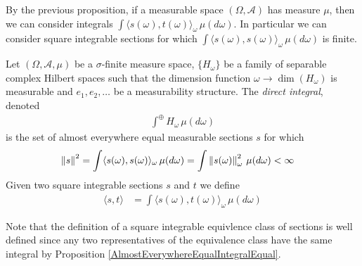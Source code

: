 By the previous proposition, if a measurable space $(\Omega, \mathcal{A})$ has measure $\mu$, then we can consider integrals $\int \langle s(\omega), t(\omega) \rangle_\omega \, \mu(d\omega)$.  In particular we can consider square integrable sections for which $\int \langle s(\omega), s(\omega) \rangle_\omega \, \mu(d\omega)$ is finite.

\begin{defn}Let $(\Omega, \mathcal{A}, \mu)$ be a $\sigma$-finite measure space, $\lbrace H_\omega \rbrace$ be a family of separable complex Hilbert spaces such that the dimension function $\omega \to \dim(H_\omega)$ is measurable and $e_1, e_2,\dotsc$ be a measurability structure. The \emph{direct integral}, denoted
\begin{align*}
\int^\oplus H_\omega \, \mu(d\omega)
\end{align*}
is the set of almost everywhere equal measurable sections $s$ for which
\begin{align*}
\left \lVert s \right \rVert^2 &= \int \langle s(\omega), s(\omega) \rangle_\omega \, \mu(d\omega) = \int \left \lVert  s(\omega) \right \rVert^2_\omega \, \mu(d\omega) < \infty
\end{align*}
Given two square integrable sections $s$ and $t$ we define 
\begin{align*}
\langle s, t \rangle &= \int \langle s(\omega), t(\omega) \rangle_\omega \, \mu(d\omega)
\end{align*}
\end{defn}

Note that the definition of a square integrable equivlence class of sections is well defined since any two representatives of the equivalence class have the same integral by Proposition \ref{AlmostEverywhereEqualIntegralEqual}.  

